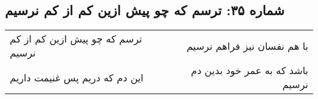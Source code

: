 \begin{center}
\section*{شماره ۳۵: ترسم که چو پیش ازین کم از کم نرسیم}
\label{sec:035}
\begin{longtable}{l p{0.5cm} r}
ترسم که چو پیش ازین کم از کم نرسیم
&&
با هم نفسان نیز فراهم نرسیم
\\
این دم که دریم پس غنیمت داریم
&&
باشد که به عمر خود بدین دم نرسیم
\\
\end{longtable}
\end{center}
